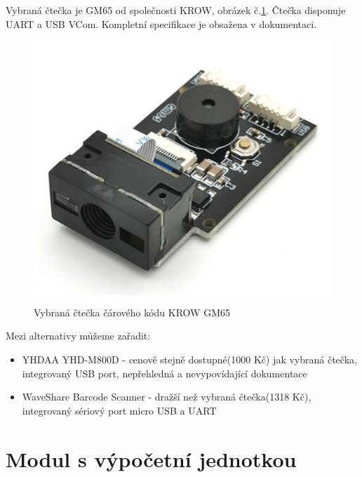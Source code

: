 Vybraná čtečka je GM65 od společnosti KROW, obrázek č.\ref{gm65}.
Čtečka disponuje UART a USB VCom. Kompletní specifikace je obsažena v dokumentaci.\cite{scaner}

\begin{figure}[!h]
    \begin{center}
        \includegraphics[scale=0.25]{obrazky/gm65.PNG} %
    \end{center}
    \caption{Vybraná čtečka čárového kódu KROW GM65 \cite{scaner}}
    \label{gm65}
\end{figure}

Mezi alternativy můžeme zařadit:
\begin{itemize}
    \item YHDAA YHD-M800D - cenově stejně dostupné(1000 Kč) jak vybraná čtečka, integrovaný USB port, nepřehledná a nevypovídající dokumentace 
    \item WaveShare Barcode Scanner - dražší než vybraná čtečka(1318 Kč), integrovaný sériový port micro USB a UART
\end{itemize}

\section{Modul s výpočetní jednotkou} %

